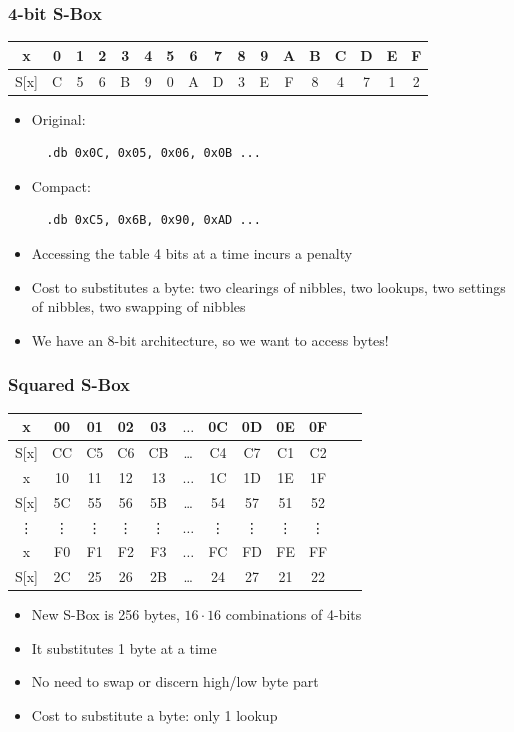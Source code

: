 \documentclass{beamer}
\begin{document}
\begin{frame}[fragile]
\frametitle{4-bit S-Box}
	\begin{tabular}{ | c | c | c | c | c | c | c | c | c | c | c | c | c | c | c | c | c | }
	  \hline                        
	     x & 0 & 1 & 2 & 3 & 4 & 5 & 6 & 7 & 8 & 9 & A & B & C & D & E & F \\
	  \hline                        
	  S[x] & C & 5 & 6 & B & 9 & 0 & A & D & 3 & E & F & 8 & 4 & 7 & 1 & 2 \\
	  \hline  
	\end{tabular}

\begin{itemize}
\item Original:
  \begin{lstlisting}
  .db 0x0C, 0x05, 0x06, 0x0B ...
  \end{lstlisting}
\item Compact:
  \begin{lstlisting}
  .db 0xC5, 0x6B, 0x90, 0xAD ...
  \end{lstlisting}
\item Accessing the table 4 bits at a time incurs a penalty
\item Cost to substitutes a byte: two clearings of nibbles, two lookups, two settings of nibbles, two swapping of nibbles
\item We have an 8-bit architecture, so we want to access bytes!
\end{itemize}
\end{frame}

\begin{frame}
\frametitle{Squared S-Box}
\begin{tabular}{| c | c  | c | c | c  | c  | c | c | c  | c | c | c |}
\hline
  x & 00 & 01 & 02 & 03  &  $\dots$  & 0C & 0D & 0E & 0F   \\
\hline
 S[x] & CC & C5 & C6 & CB & \dots & C4 & C7 & C1 & C2   \\
\hline
  x & 10 & 11 & 12 & 13  &  $\dots$  & 1C & 1D & 1E & 1F   \\
\hline
 S[x] & 5C & 55 & 56 & 5B & \dots & 54 & 57 & 51 & 52   \\
\hline
  \vdots & \vdots & \vdots & \vdots & \vdots  &  $\dots$  & \vdots &\vdots & \vdots & \vdots   \\
\hline
  x & F0 & F1 & F2 & F3  &  $\dots$  & FC & FD & FE & FF   \\
\hline
 S[x] & 2C & 25 & 26 & 2B & \dots & 24 & 27 & 21 & 22   \\
\hline
\end{tabular}

\begin{itemize}
\item New S-Box is 256 bytes, $16\cdot16$ combinations of 4-bits
\item It substitutes 1 byte at a time
\item No need to swap or discern high/low byte part
\item Cost to substitute a byte: only 1 lookup
\end{itemize}
\end{frame}
\end{document}
